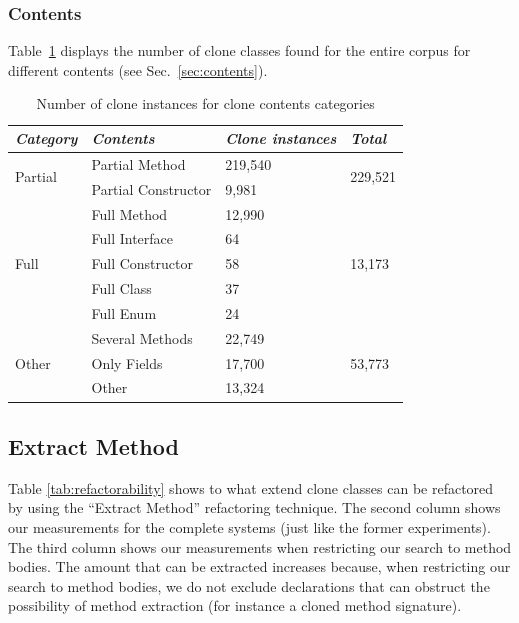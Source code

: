 \documentclass[sigconf,review, table]{acmart}
\begin{document}
\subsubsection{Contents}
Table~\ref{tab:contents} displays the number of clone classes found for the entire corpus for different contents (see Sec.~\ref{sec:contents}).

\begin{table}[H]
\centering
\begin{tabular}{@{}llll@{}}
\toprule
\textit{\textbf{Category}} & \textit{\textbf{Contents}} & \textit{\textbf{Clone instances}} & \textit{\textbf{Total}} \\ \midrule
\multirow{2}{*}{Partial} & Partial Method & 219,540 & \multirow{2}{*}{229,521} \\ \cmidrule(lr){2-3}
 & Partial Constructor & 9,981 &  \\ \midrule
\multirow{5}{*}{Full} & Full Method & 12,990 & \multirow{5}{*}{13,173} \\ \cmidrule(lr){2-3}
 & Full Interface & 64 &  \\ \cmidrule(lr){2-3}
 & Full Constructor & 58 &  \\ \cmidrule(lr){2-3}
 & Full Class & 37 &  \\ \cmidrule(lr){2-3}
 & Full Enum & 24 &  \\ \midrule
\multirow{3}{*}{Other} & Several Methods & 22,749 & \multirow{3}{*}{53,773} \\ \cmidrule(lr){2-3}
 & Only Fields & 17,700 &  \\ \cmidrule(lr){2-3}
 & Other & 13,324 &  \\ \bottomrule
\end{tabular}
\caption{Number of clone instances for clone contents categories}
\label{tab:contents}
\end{table}

\subsection{Extract Method}
Table \ref{tab:refactorability} shows to what extend clone classes can be refactored by using the ``Extract Method'' refactoring technique. The second column shows our measurements for the complete systems (just like the former experiments). The third column shows our measurements when restricting our search to method bodies. The amount that can be extracted increases because, when restricting our search to method bodies, we do not exclude declarations that can obstruct the possibility of method extraction (for instance a cloned method signature).
\end{document}
